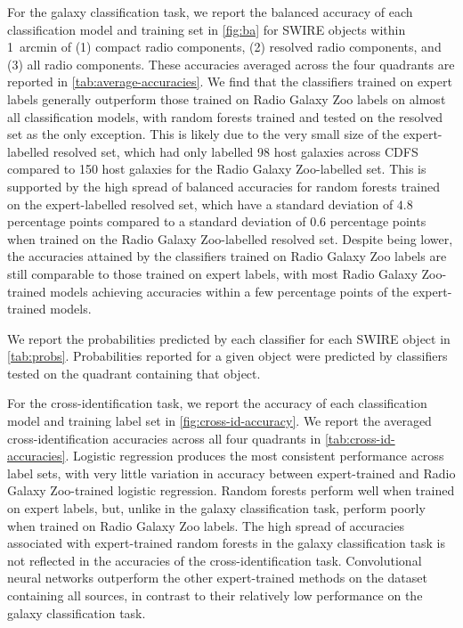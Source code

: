 \documentclass[fleqn,usenatbib,usedcolumn]{mnras}
\begin{document}
    For the galaxy classification task, we report the balanced accuracy of
    each classification model and training set in \autoref{fig:ba} for SWIRE
    objects within 1~arcmin of (1) compact radio components, (2) resolved
    radio components, and (3) all radio components. These accuracies averaged
    across the four quadrants are reported in
    \autoref{tab:average-accuracies}. We find that the classifiers trained on
    expert labels generally outperform those trained on Radio Galaxy Zoo
    labels on almost all classification models, with random forests trained
    and tested on the resolved set as the only exception. This is likely due
    to the very small size of the expert-labelled resolved set, which had only
    labelled 98 host galaxies across CDFS compared to 150 host galaxies for
    the Radio Galaxy Zoo-labelled set. This is supported by the high spread of
    balanced accuracies for random forests trained on the expert-labelled
    resolved set, which have a standard deviation of $4.8$ percentage points
    compared to a standard deviation of $0.6$ percentage points when trained
    on the Radio Galaxy Zoo-labelled resolved set. Despite being lower, the
    accuracies attained by the classifiers trained on Radio Galaxy Zoo labels
    are still comparable to those trained on expert labels, with most Radio
    Galaxy Zoo-trained models achieving accuracies within a few percentage
    points of the expert-trained models.

    We report the probabilities predicted by each classifier for each SWIRE
    object in \autoref{tab:probs}. Probabilities reported for a given object
    were predicted by classifiers tested on the quadrant containing that
    object.

    For the cross-identification task, we report the accuracy of each
    classification model and training label set in
    \autoref{fig:cross-id-accuracy}. We report the averaged
    cross-identification accuracies across all four quadrants in
    \autoref{tab:cross-id-accuracies}. Logistic regression produces the most
    consistent performance across label sets, with very little variation in
    accuracy between expert-trained and Radio Galaxy Zoo-trained logistic
    regression. Random forests perform well when trained on expert labels,
    but, unlike in the galaxy classification task, perform poorly when trained
    on Radio Galaxy Zoo labels. The high spread of accuracies associated with
    expert-trained random forests in the galaxy classification task is not
    reflected in the accuracies of the cross-identification task.
    Convolutional neural networks outperform the other expert-trained methods
    on the dataset containing all sources, in contrast to their relatively low
    performance on the galaxy classification task.
\end{document}
